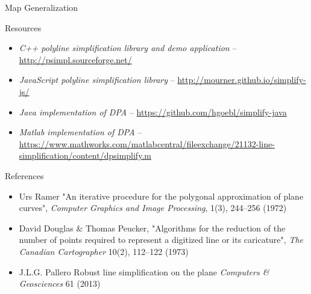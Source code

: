 \documentclass[10pt]{beamer}
\begin{document}
\begin{frame}{Map Generalization}
	\begin{figure}[h]
		\end{figure}
\end{frame}



\begin{frame}{Resources}
	\begin{itemize}
		\item \textit{C++ polyline simplification library and demo application} -- \url{http://psimpl.sourceforge.net/} 
		\item \textit{JavaScript polyline simplification library} --  \url{http://mourner.github.io/simplify-js/}
		\item \textit{Java implementation of DPA} -- \url{https://github.com/hgoebl/simplify-java}	
		\item \textit{Matlab implementation of DPA} -- \url{https://www.mathworks.com/matlabcentral/fileexchange/21132-line-simplification/content/dpsimplify.m}	
	\end{itemize}
\end{frame}
\begin{frame}{References}
	\begin{itemize}
		\item Urs Ramer 
		 	  "An iterative procedure for the polygonal approximation of plane curves", 
   			  \textit{Computer Graphics and Image Processing}, 1(3), 244–256 (1972)
		\item David Douglas \& Thomas Peucker, 
			  "Algorithms for the reduction of the number of points required to represent a digitized line or its caricature", 
			  \textit{The Canadian Cartographer} 10(2), 112–122 (1973)
		\item J.L.G. Pallero
			  Robust line simplification on the plane
			  \textit{Computers \& Geosciences} 61 (2013) 
	\end{itemize}
\end{frame}
\end{document}
